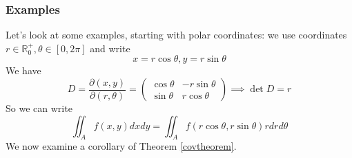 \documentclass{article}
\newcommand{\reals}[0]{\mathbb{R}}
\newcommand{\prt}[2]{\frac{\partial #1}{\partial #2}}
\begin{document}
\subsubsection{Examples}

Let's look at some examples, starting with polar coordinates: we use coordinates \(r \in \reals^+_0, \theta \in [0, 2\pi]\) and write
\begin{equation}
  x = r\cos\theta, y = r\sin\theta
\end{equation}
We have
\begin{equation}
  D = \prt{(x, y)}{(r, \theta)} = \begin{pmatrix}
    \cos\theta & -r\sin\theta \\
    \sin\theta & r\cos\theta
  \end{pmatrix} \implies \det D = r
\end{equation}
So we can write
\begin{equation}
  \iint_Af(x, y)dxdy = \iint_Af(r\cos\theta, r\sin\theta)rdrd\theta
\end{equation}
We now examine a corollary of Theorem \ref{covtheorem}.
\end{document}
